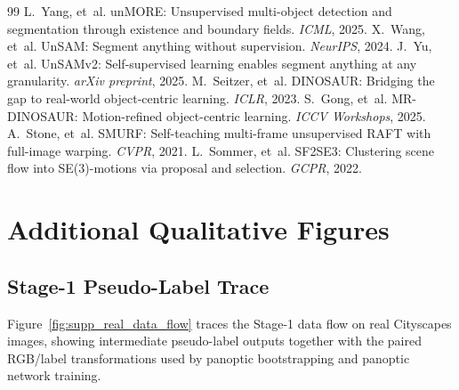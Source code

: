 \documentclass{article}
\begin{document}
\begin{thebibliography}{99}
 L.~Yang, et~al. unMORE: Unsupervised multi-object detection and segmentation through existence and boundary fields. \emph{ICML}, 2025.
 X.~Wang, et~al. UnSAM: Segment anything without supervision. \emph{NeurIPS}, 2024.
 J.~Yu, et~al. UnSAMv2: Self-supervised learning enables segment anything at any granularity. \emph{arXiv preprint}, 2025.
 M.~Seitzer, et~al. DINOSAUR: Bridging the gap to real-world object-centric learning. \emph{ICLR}, 2023.
 S.~Gong, et~al. MR-DINOSAUR: Motion-refined object-centric learning. \emph{ICCV Workshops}, 2025.
 A.~Stone, et~al. SMURF: Self-teaching multi-frame unsupervised RAFT with full-image warping. \emph{CVPR}, 2021.
 L.~Sommer, et~al. SF2SE3: Clustering scene flow into SE(3)-motions via proposal and selection. \emph{GCPR}, 2022.
\end{thebibliography}

\clearpage
\appendix
\renewcommand{\thefigure}{\Alph{section}.\arabic{figure}}
\renewcommand{\thetable}{\Alph{section}.\arabic{table}}
\makeatletter
\renewcommand{\paragraph}[1]{\par\smallskip\noindent\textit{#1}\hspace{0.5em}\ignorespaces}
\makeatother

\section{Additional Qualitative Figures}
\label{sec:supp:qualitative}

\subsection{Stage-1 Pseudo-Label Trace}
\label{sec:supp:stage1_trace}

Figure~\ref{fig:supp_real_data_flow} traces the Stage-1 data flow on real Cityscapes images, showing intermediate pseudo-label outputs together with the paired RGB/label transformations used by panoptic bootstrapping and panoptic network training.
\end{document}
